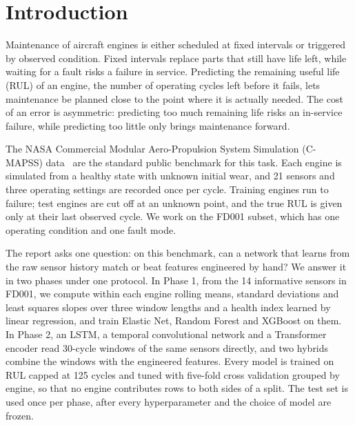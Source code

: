 \section{Introduction}
\label{sec:intro}

Maintenance of aircraft engines is either scheduled at fixed intervals or
triggered by observed condition. Fixed intervals replace parts that still
have life left, while waiting for a fault risks a failure in service.
Predicting the remaining useful life (RUL) of an engine, the number of
operating cycles left before it fails, lets maintenance be planned close to
the point where it is actually needed. The cost of an error is asymmetric:
predicting too much remaining life risks an in-service failure, while
predicting too little only brings maintenance forward.

The NASA Commercial Modular Aero-Propulsion System Simulation (C-MAPSS)
data~\cite{saxena2008damage} are the standard public benchmark for this
task. Each engine is simulated from a healthy state with unknown initial
wear, and 21 sensors and three operating settings are recorded once per
cycle. Training engines run to failure; test engines are cut off at an
unknown point, and the true RUL is given only at their last observed cycle.
We work on the FD001 subset, which has one operating condition and one
fault mode.

The report asks one question: on this benchmark, can a network that learns
from the raw sensor history match or beat features engineered by hand? We
answer it in two phases under one protocol. In Phase 1, from the 14
informative sensors in FD001, we compute within each engine rolling means,
standard deviations and least squares slopes over three window lengths and
a health index learned by linear regression, and train Elastic Net, Random
Forest and XGBoost on them. In Phase 2, an LSTM, a temporal convolutional
network and a Transformer encoder read 30-cycle windows of the same sensors
directly, and two hybrids combine the windows with the engineered features.
Every model is trained on RUL capped at 125 cycles and tuned with five-fold
cross validation grouped by engine, so that no engine contributes rows to
both sides of a split. The test set is used once per phase, after every
hyperparameter and the choice of model are frozen.

